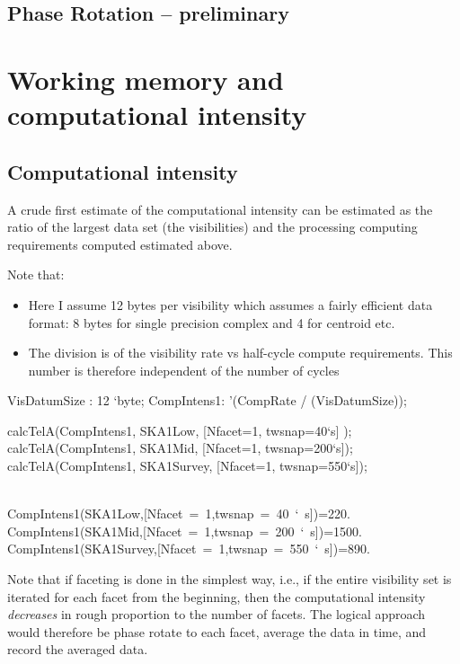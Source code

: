 \documentclass[useAMS,usenatbib,referee]{article}
\begin{document}
\subsection{Phase Rotation -- preliminary}

\section{Working memory and computational intensity}

\subsection{Computational intensity}

A crude first estimate of the computational intensity can be estimated
as the ratio of the largest data set (the visibilities) and the
processing computing requirements computed estimated above.

Note that: 
\begin{itemize}
\item Here I assume 12 bytes per visibility which assumes a fairly
  efficient data format: 8 bytes for single precision complex and 4
  for centroid etc.
\item The division is of the visibility rate vs half-cycle compute
  requirements. This number is therefore independent of the number of
  cycles
\end{itemize}

\begin{maxima}[]
VisDatumSize : 12 `byte;
CompIntens1: '(CompRate /  (VisDatumSize));

calcTelA(CompIntens1, SKA1Low, [Nfacet=1, twsnap=40`s] );
calcTelA(CompIntens1, SKA1Mid, [Nfacet=1, twsnap=200`s]);
calcTelA(CompIntens1, SKA1Survey, [Nfacet=1, twsnap=550`s]);

\maximaoutput*
{} \\
\m  \mbox{{}CompIntens1(SKA1Low,[Nfacet = 1,twsnap = 40 ` s]){}}=220. \\
\m  \mbox{{}CompIntens1(SKA1Mid,[Nfacet = 1,twsnap = 200 ` s]){}}=1500. \\
\m  \mbox{{}CompIntens1(SKA1Survey,[Nfacet = 1,twsnap = 550 ` s]){}}=890. \\
\end{maxima}

Note that if faceting is done in the simplest way, i.e., if the entire
visibility set is iterated for each facet from the beginning, then the
computational intensity \emph{decreases} in rough proportion to the
number of facets. The logical approach would therefore be phase rotate
to each facet, average the data in time, and record the averaged data. 
\end{document}
